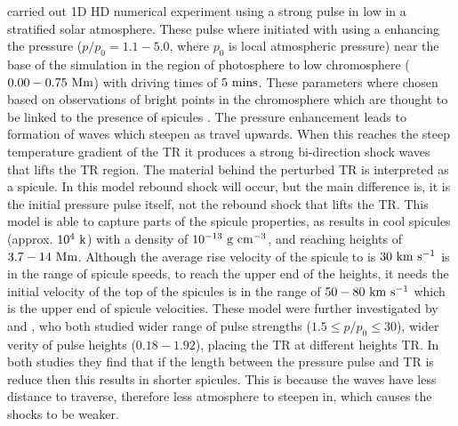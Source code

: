 \documentclass[12pt]{ociamthesis}
\newcommand{\kms}{~\rm{km ~s^{-1}}}
\newcommand{\np}{\\ \\}
\begin{document}
\cite{Suematsu1982SoPh7599S} carried out 1D HD numerical experiment using a strong pulse in low in a stratified solar atmosphere. These pulse where initiated with using a enhancing the pressure ($p/p_0=1.1-5.0$, where $p_0$ is local atmospheric pressure) near the base of the simulation in the region of photosphere to low chromosphere ($0.00-0.75~\rm{Mm}$) with driving times of $5~\rm{mins}$. These parameters where chosen based on observations of bright points in the chromosphere which are thought to be linked to the presence of spicules \citep{Suematsu1995ApJ, Jess2012ApJ744L5J, Oxley_2020ApJ905168O}. The pressure enhancement leads to formation of waves which steepen as travel upwards. When this reaches the steep temperature gradient of the TR it produces a strong bi-direction shock waves that lifts the TR region. The material behind the perturbed TR is interpreted as a spicule. In this model rebound shock will occur, but the main difference is, it is the initial pressure pulse itself, not the rebound shock that lifts the TR. This model is able to capture parts of the spicule properties, as results in cool spicules (approx. $10^4~\rm{k}$) with a density of $10^{-13}~\rm{g~cm^{-3}}$, and reaching heights of $3.7-14~\rm{Mm}$. Although the average rise velocity of the spicule to is $30\kms$ is in the range of spicule speeds, to reach the upper end of the heights, it needs the initial velocity of the top of the spicules is in the range of $50-80\kms$ which is the upper end of spicule velocities. These model were further investigated by \cite{Shibata1982SoPh78333S} and \cite{Shibata1982}, who both studied wider range of pulse strengths ($1.5 \le p/p_0 \le 30$), wider verity of pulse heights ($0.18-1.92$), placing the TR at different heights TR. In both studies they find that if the length between the pressure pulse and TR is reduce then this results in shorter spicules. This is because the waves have less distance to traverse, therefore less atmosphere to steepen in, which causes the shocks to be weaker. \np
%
\end{document}
